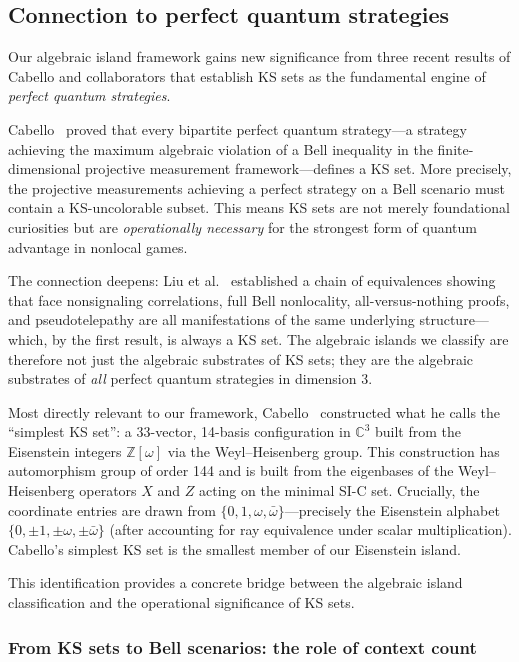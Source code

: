\documentclass[12pt,a4paper]{article}
\newcommand{\C}{\mathbb{C}}
\newcommand{\Z}{\mathbb{Z}}
\begin{document}
\subsection{Connection to perfect quantum strategies}\label{sec:cabello}

Our algebraic island framework gains new significance from three recent results of Cabello and collaborators that establish KS sets as the fundamental engine of \emph{perfect quantum strategies}.

Cabello~\cite{Cabello2024bipartite} proved that every bipartite perfect quantum strategy---a strategy achieving the maximum algebraic violation of a Bell inequality in the finite-dimensional projective measurement framework---defines a KS set. More precisely, the projective measurements achieving a perfect strategy on a Bell scenario must contain a KS-uncolorable subset. This means KS sets are not merely foundational curiosities but are \emph{operationally necessary} for the strongest form of quantum advantage in nonlocal games.

The connection deepens: Liu et al.~\cite{Cabello2024equivalences} established a chain of equivalences showing that face nonsignaling correlations, full Bell nonlocality, all-versus-nothing proofs, and pseudotelepathy are all manifestations of the same underlying structure---which, by the first result, is always a KS set. The algebraic islands we classify are therefore not just the algebraic substrates of KS sets; they are the algebraic substrates of \emph{all} perfect quantum strategies in dimension 3.

Most directly relevant to our framework, Cabello~\cite{Cabello2025simplest} constructed what he calls the ``simplest KS set'': a 33-vector, 14-basis configuration in $\C^3$ built from the Eisenstein integers $\Z[\omega]$ via the Weyl--Heisenberg group. This construction has automorphism group of order 144 and is built from the eigenbases of the Weyl--Heisenberg operators $X$ and $Z$ acting on the minimal SI-C set. Crucially, the coordinate entries are drawn from $\{0, 1, \omega, \bar\omega\}$---precisely the Eisenstein alphabet $\{0, \pm 1, \pm\omega, \pm\bar\omega\}$ (after accounting for ray equivalence under scalar multiplication). Cabello's simplest KS set is the smallest member of our Eisenstein island.

This identification provides a concrete bridge between the algebraic island classification and the operational significance of KS sets.

\subsubsection{From KS sets to Bell scenarios: the role of context count}\label{sec:ks-bell}
\end{document}
